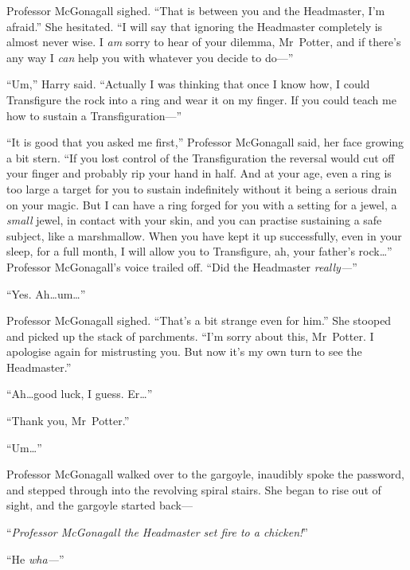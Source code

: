 Professor McGonagall sighed. “That is between you and the Headmaster, I’m afraid.” She hesitated. “I will say that ignoring the Headmaster completely is almost never wise. I \emph{am} sorry to hear of your dilemma, Mr~Potter, and if there’s any way I \emph{can} help you with whatever you decide to do—”

“Um,” Harry said. “Actually I was thinking that once I know how, I could Transfigure the rock into a ring and wear it on my finger. If you could teach me how to sustain a Transfiguration—”

“It is good that you asked me first,” Professor McGonagall said, her face growing a bit stern. “If you lost control of the Transfiguration the reversal would cut off your finger and probably rip your hand in half. And at your age, even a ring is too large a target for you to sustain indefinitely without it being a serious drain on your magic. But I can have a ring forged for you with a setting for a jewel, a \emph{small} jewel, in contact with your skin, and you can practise sustaining a safe subject, like a marshmallow. When you have kept it up successfully, even in your sleep, for a full month, I will allow you to Transfigure, ah, your father’s rock…” Professor McGonagall’s voice trailed off. “Did the Headmaster \emph{really—}”

“Yes. Ah…um…”

Professor McGonagall sighed. “That’s a bit strange even for him.” She stooped and picked up the stack of parchments. “I’m sorry about this, Mr~Potter. I apologise again for mistrusting you. But now it’s my own turn to see the Headmaster.”

“Ah…good luck, I guess. Er…”

“Thank you, Mr~Potter.”

“Um…”

Professor McGonagall walked over to the gargoyle, inaudibly spoke the password, and stepped through into the revolving spiral stairs. She began to rise out of sight, and the gargoyle started back—

“\emph{Professor McGonagall the Headmaster set fire to a chicken!}”

“He \emph{wha—}”
